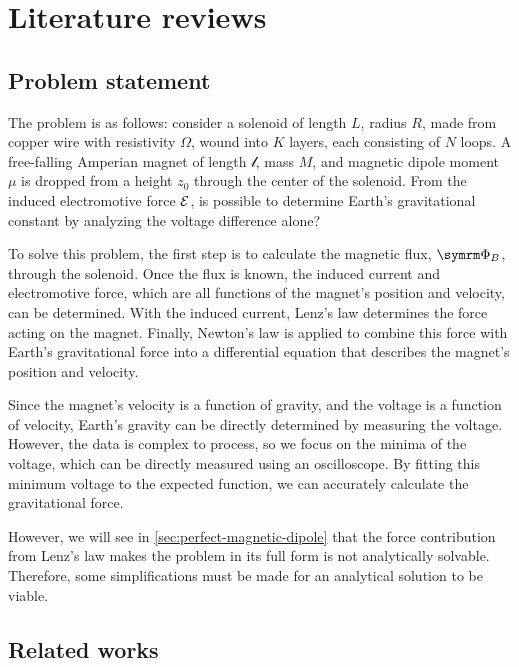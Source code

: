 \chapter{Literature reviews}

\section{Problem statement}
\label{sec:problem-statement}

The problem is as follows: consider a solenoid of length $L$, radius $R$, made from copper wire with resistivity $\Omega$, wound into $K$ layers, each consisting of $N$ loops. A free-falling Amperian magnet of length $\mathcal{l}$, mass $M$, and magnetic dipole moment $\mu$ is dropped from a height $z_0$ through the center of the solenoid. From the induced electromotive force $\mathcal{E}$, is possible to determine Earth's gravitational constant by analyzing the voltage difference alone?

To solve this problem, the first step is to calculate the magnetic flux, $\mflux$, through the solenoid. Once the flux is known, the induced current and electromotive force, which are all functions of the magnet's position and velocity, can be determined. With the induced current, Lenz's law determines the force acting on the magnet. Finally, Newton's law is applied to combine this force with Earth's gravitational force into a differential equation that describes the magnet's position and velocity.

Since the magnet's velocity is a function of gravity, and the voltage is a function of velocity, Earth's gravity can be directly determined by measuring the voltage. However, the data is complex to process, so we focus on the minima of the voltage, which can be directly measured using an oscilloscope. By fitting this minimum voltage to the expected function, we can accurately calculate the gravitational force.

However, we will see in \cref{sec:perfect-magnetic-dipole} that the force contribution from Lenz's law makes the problem in its full form is not analytically solvable. Therefore, some simplifications must be made for an analytical solution to be viable.

\section{Related works}
\label{sec:related-works}


